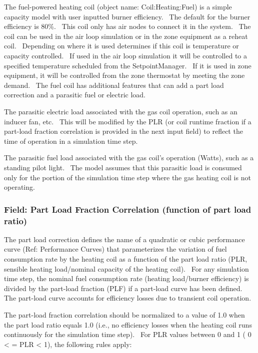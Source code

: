 The fuel-powered heating coil (object name: Coil:Heating:Fuel) is a simple capacity model with user inputted burner efficiency.~ The default for the burner efficiency is 80\%.~ This coil only has air nodes to connect it in the system.~ The coil can be used in the air loop simulation or in the zone equipment as a reheat coil.~ Depending on where it is used determines if this coil is temperature or capacity controlled.~ If used in the air loop simulation it will be controlled to a specified temperature scheduled from the SetpointManager.~ If it is used in zone equipment, it will be controlled from the zone thermostat by meeting the zone demand.~ The fuel coil has additional features that can add a part load correction and a parasitic fuel or electric load.

The parasitic electric load associated with the gas coil operation, such as an inducer fan, etc.~ This will be modified by the PLR (or coil runtime fraction if a part-load fraction correlation is provided in the next input field) to reflect the time of operation in a simulation time step.

The parasitic fuel load associated with the gas coil's operation (Watts), such as a standing pilot light.~ The model assumes that this parasitic load is consumed only for the portion of the simulation time step where the gas heating coil is not operating.

\subsubsection{Field: Part Load Fraction Correlation (function of part load ratio)}\label{field-part-load-fraction-correlation-function-of-part-load-ratio}

The part load correction defines the name of a quadratic or cubic performance curve (Ref: Performance Curves) that parameterizes the variation of fuel consumption rate by the heating coil as a function of the part load ratio (PLR, sensible heating load/nominal capacity of the heating coil).~ For any simulation time step, the nominal fuel consumption rate (heating load/burner efficiency) is divided by the part-load fraction (PLF) if a part-load curve has been defined.~ The part-load curve accounts for efficiency losses due to transient coil operation.

The part-load fraction correlation should be normalized to a value of 1.0 when the part load ratio equals 1.0 (i.e., no efficiency losses when the heating coil runs continuously for the simulation time step).~ For PLR values between 0 and 1 ( 0 \textless{} = PLR \textless{} 1), the following rules apply:

